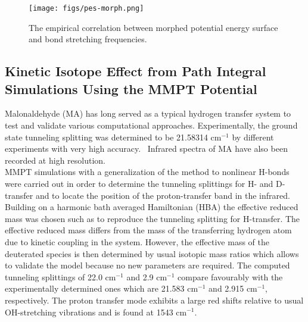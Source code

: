 \documentclass[journal=jacsat,manuscript=article]{achemso}
\begin{document}
\begin{figure}
\texttt{[image: figs/pes-morph.png]}
\caption{The empirical correlation between morphed potential energy surface and bond stretching frequencies.}
	\label{fig:pes-morph}
\end{figure}


\subsection{Kinetic Isotope Effect from Path Integral Simulations Using the MMPT Potential}
Malonaldehyde (MA) has long served as a typical hydrogen transfer
system to test and validate various computational
approaches. Experimentally, the ground state tunneling splitting was
determined to be 21.58314 cm$^{-1}$ by different experiments with very
high accuracy.~\cite{mawilson81,mafirth91} Infrared spectra of MA have
also been recorded at high
resolution.~\cite{maexp83,maexp89,maexp92,maexp04}\\

\noindent
MMPT simulations with a generalization of the method to nonlinear
H-bonds were carried out in order to determine the tunneling
splittings for H- and D-transfer and to locate the position of the
proton-transfer band in the infrared.\cite{MM10ma} Building on a
harmonic bath averaged Hamiltonian (HBA) the effective reduced mass
was chosen such as to reproduce the tunneling splitting for
H-transfer. The effective reduced mass differs from the mass of the
transferring hydrogen atom due to kinetic coupling in the
system.\cite{MM10ma} However, the effective mass of the deuterated
species is then determined by usual isotopic mass ratios which allows
to validate the model because no new parameters are required. The
computed tunneling splittings of 22.0 cm$^{-1}$ and 2.9 cm$^{-1}$
compare favourably with the experimentally determined ones which are
21.583 cm$^{-1}$ and 2.915 cm$^{-1}$,
respectively.\cite{mawilson81,mafirth91,wilson84:2260} The proton
transfer mode exhibits a large red shifts relative to usual
OH-stretching vibrations and is found at 1543 cm$^{-1}$.\\
\end{document}
